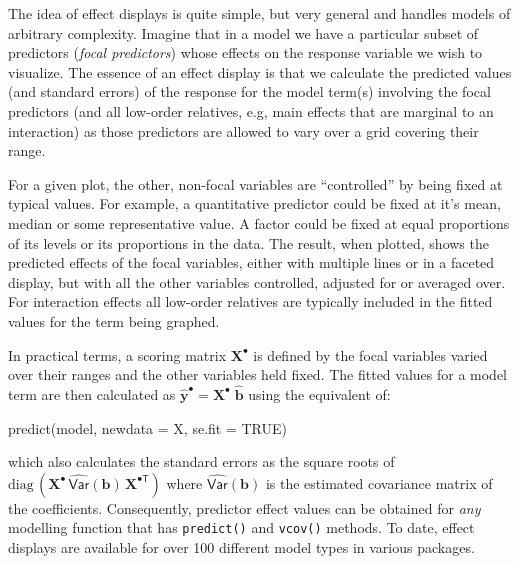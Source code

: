 \documentclass[
  letterpaper,
  10pt,
  krantz2]{krantz}
\makeatletter
\newenvironment{Shaded}{\begin{snugshade}}{\end{snugshade}}
\newcommand{\AttributeTok}[1]{\textcolor[rgb]{0.40,0.45,0.13}{#1}}
\newcommand{\ConstantTok}[1]{\textcolor[rgb]{0.56,0.35,0.01}{#1}}
\newcommand{\FunctionTok}[1]{\textcolor[rgb]{0.28,0.35,0.67}{#1}}
\newcommand{\NormalTok}[1]{\textcolor[rgb]{0.00,0.23,0.31}{#1}}
\newenvironment{kframe}{%
  \medskip{}
  \setlength{\fboxsep}{.8em}
  \def\at@end@of@kframe{}%
  \ifinner\ifhmode%
  \def\at@end@of@kframe{\end{minipage}}%
  \begin{minipage}{\columnwidth}%
  \fi\fi%
  \def\FrameCommand##1{\hskip\@totalleftmargin \hskip-\fboxsep
  \colorbox{shadecolor}{##1}\hskip-\fboxsep
      \hskip-\linewidth \hskip-\@totalleftmargin \hskip\columnwidth}%
  \MakeFramed {\advance\hsize-\width
    \@totalleftmargin\z@ \linewidth\hsize
    \@setminipage}}%
{\par\unskip\endMakeFramed%
  \at@end@of@kframe}
\renewenvironment{Shaded}{\begin{kframe}}{\end{kframe}}
\makeatother
\begin{document}
The idea of effect displays is quite simple, but very general and
handles models of arbitrary complexity. Imagine that in a model we have
a particular subset of predictors (\emph{focal predictors}) whose
effects on the response variable we wish to visualize. The essence of an
effect display is that we calculate the predicted values (and standard
errors) of the response for the model term(s) involving the focal
predictors (and all low-order relatives, e.g, main effects that are
marginal to an interaction) as those predictors are allowed to vary over
a grid covering their range.

For a given plot, the other, non-focal variables are ``controlled'' by
being fixed at typical values. For example, a quantitative predictor
could be fixed at it's mean, median or some representative value. A
factor could be fixed at equal proportions of its levels or its
proportions in the data. The result, when plotted, shows the predicted
effects of the focal variables, either with multiple lines or in a
faceted display, but with all the other variables controlled, adjusted
for or averaged over. For interaction effects all low-order relatives
are typically included in the fitted values for the term being graphed.

In practical terms, a scoring matrix \(\mathbf{X}^\bullet\) is defined
by the focal variables varied over their ranges and the other variables
held fixed. The fitted values for a model term are then calculated as
\(\widehat{\mathbf{y}}^\bullet = \mathbf{X}^\bullet \; \widehat{\mathbf{b}}\)
using the equivalent of:

\begin{Shaded}
\begin{Highlighting}[]
\FunctionTok{predict}\NormalTok{(model, }\AttributeTok{newdata =}\NormalTok{ X, }\AttributeTok{se.fit =} \ConstantTok{TRUE}\NormalTok{) }
\end{Highlighting}
\end{Shaded}

which also calculates the standard errors as the square roots of
\(\mathrm{diag}\, (\mathbf{X}^\bullet \, \widehat{\mathbf{\mathsf{Var}}} (\mathbf{b}) \, \mathbf{X}^{\bullet\mathsf{T}} )\)
where \(\widehat{\mathbf{\mathsf{Var}}} (\mathbf{b})\) is the estimated
covariance matrix of the coefficients. Consequently, predictor effect
values can be obtained for \emph{any} modelling function that has
\texttt{predict()} and \texttt{vcov()} methods. To date, effect displays
are available for over 100 different model types in various packages.
\end{document}
